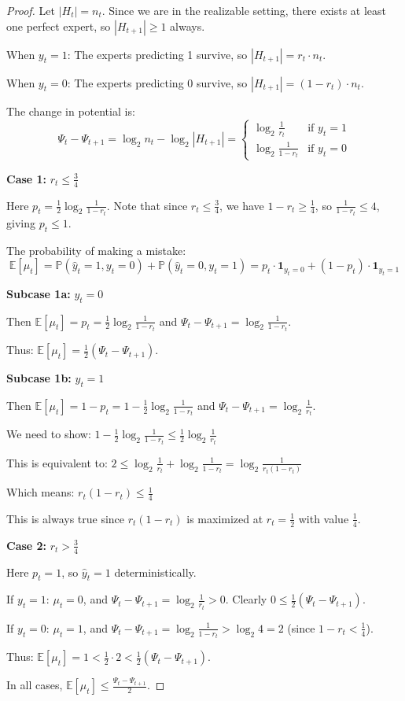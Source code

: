 \documentclass[letterpaper, 11pt]{article}
\newcommand{\1}{\mathds{1}}	%
\theoremstyle{definition}
\begin{document}
\begin{proof}
Let $|H_t| = n_t$. Since we are in the realizable setting, there exists at least one perfect expert, so $|H_{t+1}| \geq 1$ always.

When $y_t = 1$: The experts predicting 1 survive, so $|H_{t+1}| = r_t \cdot n_t$.

When $y_t = 0$: The experts predicting 0 survive, so $|H_{t+1}| = (1-r_t) \cdot n_t$.

The change in potential is:
$$\Psi_t - \Psi_{t+1} = \log_2 n_t - \log_2 |H_{t+1}| = \begin{cases} \log_2 \frac{1}{r_t} & \text{if } y_t = 1 \\ \log_2 \frac{1}{1-r_t} & \text{if } y_t = 0 \end{cases}$$

\textbf{Case 1:} $r_t \leq \frac{3}{4}$

Here $p_t = \frac{1}{2}\log_2 \frac{1}{1-r_t}$. Note that since $r_t \leq \frac{3}{4}$, we have $1-r_t \geq \frac{1}{4}$, so $\frac{1}{1-r_t} \leq 4$, giving $p_t \leq 1$.

The probability of making a mistake:
$$\mathbb{E}[\mu_t] = \mathbb{P}(\widehat{y}_t = 1, y_t = 0) + \mathbb{P}(\widehat{y}_t = 0, y_t = 1) = p_t \cdot \mathbf{1}_{y_t=0} + (1-p_t) \cdot \mathbf{1}_{y_t=1}$$

\textbf{Subcase 1a:} $y_t = 0$

Then $\mathbb{E}[\mu_t] = p_t = \frac{1}{2}\log_2 \frac{1}{1-r_t}$ and $\Psi_t - \Psi_{t+1} = \log_2 \frac{1}{1-r_t}$.

Thus: $\mathbb{E}[\mu_t] = \frac{1}{2}(\Psi_t - \Psi_{t+1})$.

\textbf{Subcase 1b:} $y_t = 1$

Then $\mathbb{E}[\mu_t] = 1 - p_t = 1 - \frac{1}{2}\log_2 \frac{1}{1-r_t}$ and $\Psi_t - \Psi_{t+1} = \log_2 \frac{1}{r_t}$.

We need to show: $1 - \frac{1}{2}\log_2 \frac{1}{1-r_t} \leq \frac{1}{2}\log_2 \frac{1}{r_t}$

This is equivalent to: $2 \leq \log_2 \frac{1}{r_t} + \log_2 \frac{1}{1-r_t} = \log_2 \frac{1}{r_t(1-r_t)}$

Which means: $r_t(1-r_t) \leq \frac{1}{4}$

This is always true since $r_t(1-r_t)$ is maximized at $r_t = \frac{1}{2}$ with value $\frac{1}{4}$.

\textbf{Case 2:} $r_t > \frac{3}{4}$

Here $p_t = 1$, so $\widehat{y}_t = 1$ deterministically.

If $y_t = 1$: $\mu_t = 0$, and $\Psi_t - \Psi_{t+1} = \log_2 \frac{1}{r_t} > 0$. Clearly $0 \leq \frac{1}{2}(\Psi_t - \Psi_{t+1})$.

If $y_t = 0$: $\mu_t = 1$, and $\Psi_t - \Psi_{t+1} = \log_2 \frac{1}{1-r_t} > \log_2 4 = 2$ (since $1-r_t < \frac{1}{4}$).

Thus: $\mathbb{E}[\mu_t] = 1 < \frac{1}{2} \cdot 2 < \frac{1}{2}(\Psi_t - \Psi_{t+1})$.

In all cases, $\mathbb{E}[\mu_t] \leq \frac{\Psi_t - \Psi_{t+1}}{2}$.
\end{proof}
\end{document}
